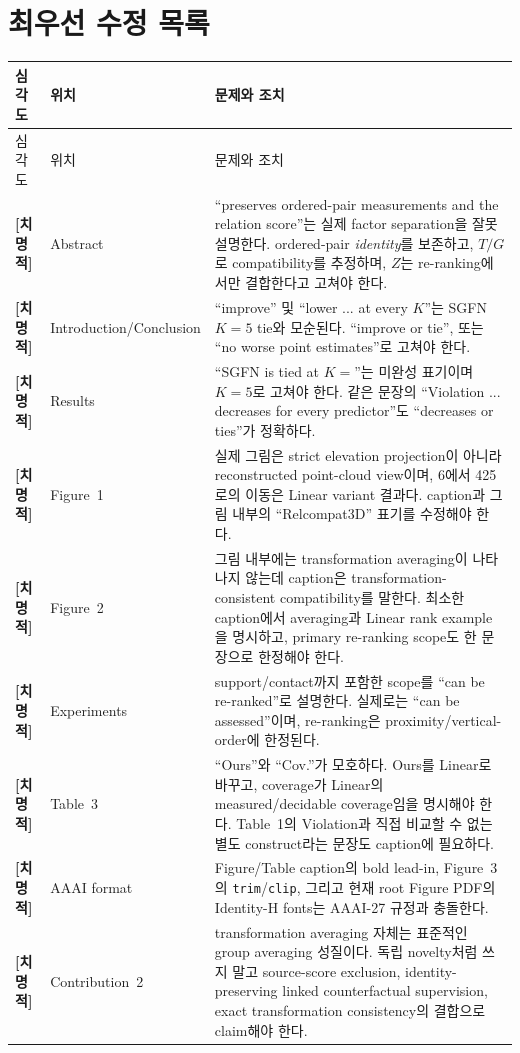 \documentclass[11pt]{article}
\newcommand{\fatal}{\textbf{\textcolor{fatalred}{[치명적]}}}
\begin{document}
\section{최우선 수정 목록}

\begin{longtable}{@{}p{}p{}p{}@{}}
\toprule
심각도 & 위치 & 문제와 조치 \\
\midrule
\endfirsthead
\toprule
심각도 & 위치 & 문제와 조치 \\
\midrule
\endhead
\fatal{} & Abstract & ``preserves ordered-pair measurements and the relation
score''는 실제 factor separation을 잘못 설명한다. ordered-pair \emph{identity}를
보존하고, $T/G$로 compatibility를 추정하며, $Z$는 re-ranking에서만 결합한다고
고쳐야 한다. \\
\fatal{} & Introduction/Conclusion & ``improve'' 및 ``lower ... at every
$K$''는 SGFN $K=5$ tie와 모순된다. ``improve or tie'', 또는 ``no worse point
estimates''로 고쳐야 한다. \\
\fatal{} & Results & ``SGFN is tied at $K=$''는 미완성 표기이며 $K=5$로
고쳐야 한다. 같은 문장의 ``Violation ... decreases for every predictor''도
``decreases or ties''가 정확하다. \\
\fatal{} & Figure~1 & 실제 그림은 strict elevation projection이 아니라
reconstructed point-cloud view이며, 6에서 425로의 이동은 Linear variant 결과다.
caption과 그림 내부의 ``Relcompat3D'' 표기를 수정해야 한다. \\
\fatal{} & Figure~2 & 그림 내부에는 transformation averaging이 나타나지 않는데
caption은 transformation-consistent compatibility를 말한다. 최소한 caption에서
averaging과 Linear rank example을 명시하고, primary re-ranking scope도 한 문장으로
한정해야 한다. \\
\fatal{} & Experiments & support/contact까지 포함한 scope를 ``can be re-ranked''로
설명한다. 실제로는 ``can be assessed''이며, re-ranking은 proximity/vertical-order에
한정된다. \\
\fatal{} & Table~3 & ``Ours''와 ``Cov.''가 모호하다. Ours를 Linear로 바꾸고,
coverage가 Linear의 measured/decidable coverage임을 명시해야 한다. Table~1의
Violation과 직접 비교할 수 없는 별도 construct라는 문장도 caption에 필요하다. \\
\fatal{} & AAAI format & Figure/Table caption의 bold lead-in, Figure~3의
\texttt{trim}/\texttt{clip}, 그리고 현재 root Figure PDF의 Identity-H fonts는
AAAI-27 규정과 충돌한다. \\
\fatal{} & Contribution~2 & transformation averaging 자체는 표준적인 group
averaging 성질이다. 독립 novelty처럼 쓰지 말고 source-score exclusion,
identity-preserving linked counterfactual supervision, exact transformation
consistency의 결합으로 claim해야 한다. \\
\bottomrule
\end{longtable}
\end{document}
